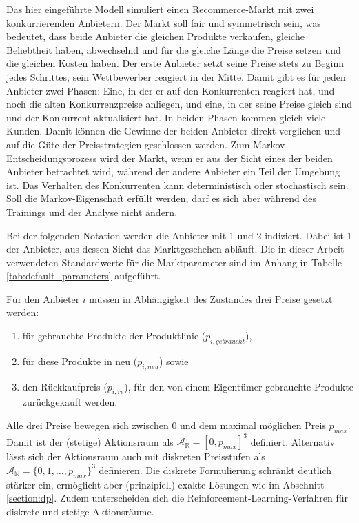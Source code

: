 Das hier eingeführte Modell simuliert einen Recommerce-Markt mit zwei konkurrierenden Anbietern.
Der Markt soll fair und symmetrisch sein, was bedeutet, dass beide Anbieter die gleichen Produkte verkaufen, gleiche Beliebtheit haben, abwechselnd und für die gleiche Länge die Preise setzen und die gleichen Kosten haben.
Der erste Anbieter setzt seine Preise stets zu Beginn jedes Schrittes, sein Wettbewerber reagiert in der Mitte.
Damit gibt es für jeden Anbieter zwei Phasen: Eine, in der er auf den Konkurrenten reagiert hat, und noch die alten Konkurrenzpreise anliegen, und eine, in der seine Preise gleich sind und der Konkurrent aktualisiert hat.
In beiden Phasen kommen gleich viele Kunden.
Damit können die Gewinne der beiden Anbieter direkt verglichen und auf die Güte der Preisstrategien geschlossen werden.
Zum Markov-Entscheidungsprozess wird der Markt, wenn er aus der Sicht eines der beiden Anbieter betrachtet wird, während der andere Anbieter ein Teil der Umgebung ist.
Das Verhalten des Konkurrenten kann deterministisch oder stochastisch sein.
Soll die Markov-Eigenschaft erfüllt werden, darf es sich aber während des Trainings und der Analyse nicht ändern.

Bei der folgenden Notation werden die Anbieter mit 1 und 2 indiziert.
Dabei ist 1 der Anbieter, aus dessen Sicht das Marktgeschehen abläuft.
Die in dieser Arbeit verwendeten Standardwerte für die Marktparameter sind im Anhang in Tabelle \ref{tab:default_parameters} aufgeführt.

Für den Anbieter $i$ müssen in Abhängigkeit des Zustandes drei Preise gesetzt werden:
\begin{enumerate}
	\item für gebrauchte Produkte der Produktlinie ($p_{i, gebraucht}$),
	\item für diese Produkte in neu ($p_{i, neu}$) sowie
	\item den Rückkaufpreis ($p_{i, re}$), für den von einem Eigentümer gebrauchte Produkte zurückgekauft werden.
\end{enumerate}
Alle drei Preise bewegen sich zwischen 0 und dem maximal möglichen Preis $p_{max}$.
Damit ist der (stetige) Aktionsraum als $\mathcal{A}_\mathbb{R}=[0, p_{max}]^3$ definiert.
Alternativ lässt sich der Aktionsraum auch mit diskreten Preisstufen als $\mathcal{A}_\mathbb{N}=\{0, 1, \ldots, p_{max}\}^3$ definieren.
Die diskrete Formulierung schränkt deutlich stärker ein, ermöglicht aber (prinzipiell) exakte Lösungen wie im Abschnitt \ref{section:dp}.
Zudem unterscheiden sich die Reinforcement-Learning-Verfahren für diskrete und stetige Aktionsräume.

